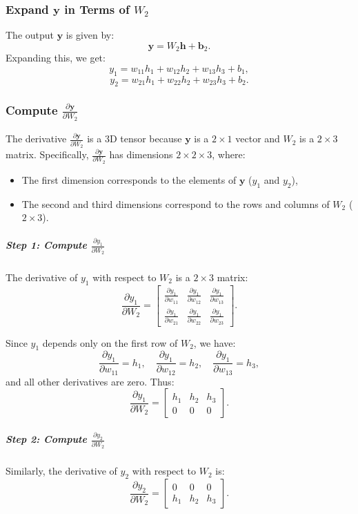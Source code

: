 \begin{notechapter}
\subsubsection{Expand \( \mathbf{y} \) in Terms of \( W_2 \)}
The output \( \mathbf{y} \) is given by:
\[
\mathbf{y} = W_2 \mathbf{h} + \mathbf{b}_2.
\]
Expanding this, we get:
\[
y_1 = w_{11} h_1 + w_{12} h_2 + w_{13} h_3 + b_1,
\]
\[
y_2 = w_{21} h_1 + w_{22} h_2 + w_{23} h_3 + b_2.
\]

\subsubsection{Compute \( \frac{\partial \mathbf{y}}{\partial W_2} \)}
The derivative \( \frac{\partial \mathbf{y}}{\partial W_2} \) is a 3D tensor because \( \mathbf{y} \) is a \( 2 \times 1 \) vector and \( W_2 \) is a \( 2 \times 3 \) matrix. Specifically, \( \frac{\partial \mathbf{y}}{\partial W_2} \) has dimensions \( 2 \times 2 \times 3 \), where:
\begin{itemize}
    \item The first dimension corresponds to the elements of \( \mathbf{y} \) (\( y_1 \) and \( y_2 \)),
    \item The second and third dimensions correspond to the rows and columns of \( W_2 \) (\( 2 \times 3 \)).
\end{itemize}

\subparagraph*{Step 1: Compute \( \frac{\partial y_1}{\partial W_2} \)}
The derivative of \( y_1 \) with respect to \( W_2 \) is a \( 2 \times 3 \) matrix:
\[
\frac{\partial y_1}{\partial W_2} = \begin{bmatrix}
\frac{\partial y_1}{\partial w_{11}} & \frac{\partial y_1}{\partial w_{12}} & \frac{\partial y_1}{\partial w_{13}} \\
\frac{\partial y_1}{\partial w_{21}} & \frac{\partial y_1}{\partial w_{22}} & \frac{\partial y_1}{\partial w_{23}}
\end{bmatrix}.
\]

Since \( y_1 \) depends only on the first row of \( W_2 \), we have:
\[
\frac{\partial y_1}{\partial w_{11}} = h_1, \quad \frac{\partial y_1}{\partial w_{12}} = h_2, \quad \frac{\partial y_1}{\partial w_{13}} = h_3,
\]
and all other derivatives are zero. Thus:
\[
\frac{\partial y_1}{\partial W_2} = \begin{bmatrix}
h_1 & h_2 & h_3 \\
0 & 0 & 0
\end{bmatrix}.
\]

\subparagraph*{Step 2: Compute \( \frac{\partial y_2}{\partial W_2} \)}
Similarly, the derivative of \( y_2 \) with respect to \( W_2 \) is:
\[
\frac{\partial y_2}{\partial W_2} = \begin{bmatrix}
0 & 0 & 0 \\
h_1 & h_2 & h_3
\end{bmatrix}.
\]


\end{notechapter}
